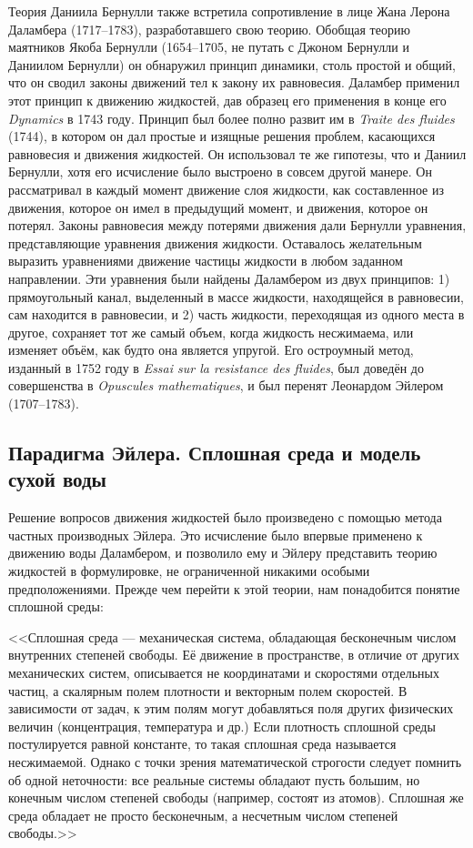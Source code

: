 Теория Даниила Бернулли также встретила сопротивление в лице Жана Лерона Даламбера (1717--1783), разработавшего 
свою теорию. Обобщая теорию маятников Якоба Бернулли (1654--1705, не путать с Джоном Бернулли и Даниилом Бернулли) 
он обнаружил принцип динамики, столь простой и общий, что он сводил законы движений тел к закону их равновесия. 
Даламбер применил этот принцип к движению жидкостей, дав образец его применения в конце его \textit{Dynamics} 
в 1743 году. Принцип был более полно развит им в \textit{Traite des fluides} (1744), в котором он дал простые 
и изящные решения проблем, касающихся равновесия и движения жидкостей. Он использовал те же гипотезы, что и 
Даниил Бернулли, хотя его исчисление было выстроено в совсем другой манере. Он рассматривал в каждый момент 
движение слоя жидкости, как составленное из движения, которое он имел в предыдущий момент, и движения, которое 
он потерял. Законы равновесия между потерями движения дали Бернулли уравнения, представляющие уравнения движения
жидкости. Оставалось желательным выразить уравнениями движение частицы жидкости в любом заданном направлении. 
Эти уравнения были найдены Даламбером из двух принципов: 1) прямоугольный канал, выделенный в массе жидкости, 
находящейся в равновесии, сам находится в равновесии, и 2) часть жидкости, переходящая из одного места в другое, 
сохраняет тот же самый объем, когда жидкость несжимаема, или изменяет объём, как будто она является упругой.
 Его остроумный метод, изданный в 1752 году в \textit{Essai sur la resistance des fluides}, был доведён до 
 совершенства в \textit{Opuscules mathematiques}, и был перенят Леонардом Эйлером (1707--1783).

\subsection*{Парадигма Эйлера. Сплошная среда и модель сухой воды}

Решение вопросов движения жидкостей было произведено с помощью метода частных производных Эйлера. 
Это исчисление было впервые применено к движению воды Даламбером, и позволило ему и Эйлеру представить теорию
 жидкостей в формулировке, не ограниченной никакими особыми предположениями. Прежде чем перейти к этой теории, 
 нам понадобится понятие сплошной среды:

<<Сплошная среда — механическая система, обладающая бесконечным числом внутренних степеней свободы. Её движение 
в пространстве, в отличие от других механических систем, описывается не координатами и скоростями отдельных 
частиц, а скалярным полем плотности и векторным полем скоростей. В зависимости от задач, к этим полям могут 
добавляться поля других физических величин (концентрация, температура и др.) Если плотность сплошной среды 
постулируется равной константе, то такая сплошная среда называется несжимаемой. Однако с точки зрения 
математической строгости следует помнить об одной неточности: все реальные системы обладают пусть большим, 
но конечным числом степеней свободы (например, состоят из атомов). Сплошная же среда обладает не просто 
бесконечным, а несчетным числом степеней свободы.>>

